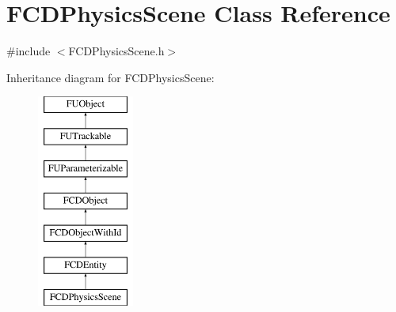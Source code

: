 \hypertarget{classFCDPhysicsScene}{
\section{FCDPhysicsScene Class Reference}
\label{classFCDPhysicsScene}
}


{\ttfamily \#include $<$FCDPhysicsScene.h$>$}

Inheritance diagram for FCDPhysicsScene:\begin{figure}[H]
\begin{center}
\leavevmode
\includegraphics[height=7.000000cm]{classFCDPhysicsScene}
\end{center}
\end{figure}
